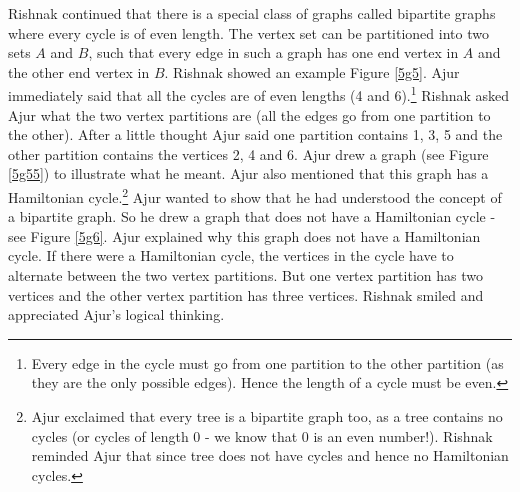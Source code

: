 Rishnak continued that there is a special class of graphs called bipartite graphs where every cycle is of even length. The vertex set can be partitioned into two sets $A$ and $B$, such that every edge in such a graph has one end vertex in $A$ and the other end vertex in $B$. Rishnak showed an example Figure \ref{5g5}. Ajur immediately said that all the cycles are of even lengths (4 and 6).\footnote{Every edge in the cycle must go from one partition to the other partition (as they are the only possible edges). Hence the length of a cycle must be even.} Rishnak asked Ajur what the two vertex partitions are (all the edges go from one partition to the other). After a little thought Ajur said one partition contains 1, 3, 5 and the other partition contains the vertices 2, 4 and 6. Ajur drew a graph (see Figure \ref{5g55}) to illustrate  what he meant. Ajur also mentioned that this graph has a Hamiltonian cycle.\footnote{Ajur exclaimed that every tree is a bipartite graph too, as a tree contains no cycles (or cycles of length 0 - we know that 0 is an even number!). Rishnak reminded Ajur that since tree does not have cycles and hence no Hamiltonian cycles.} 
Ajur wanted to show that he had understood the concept of a bipartite graph. So he drew a graph that does not have a Hamiltonian cycle - see Figure \ref{5g6}. Ajur explained why this graph does not have a Hamiltonian cycle. If there were a Hamiltonian cycle, the vertices in the cycle have to alternate between the two vertex partitions. But one vertex partition has two vertices and the other vertex partition has three vertices. Rishnak smiled and appreciated Ajur's logical thinking.

